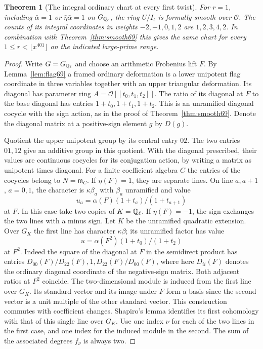 \documentclass[a4paper,11pt]{article}
\newtheorem{theorem}[proposition]{Theorem}
\theoremstyle{definition}
\theoremstyle{remark}
\numberwithin{equation}{section}
\newcommand{\OO}{\mathcal O}
\begin{document}
\begin{theorem}[The integral ordinary chart at every first twist]\label{thm:first72}
For \(r=1\), including \(\bar\alpha=1\) or
\(\bar\eta\bar\alpha=1\) on \(G_{\mathbb Q_\ell}\), the ring \(U/I_t\)
is formally smooth over \(\OO\). The counts of its integral
coordinates in weights \(-2,-1,0,1,2\) are \(1,2,3,4,2\).
In combination with Theorem~\ref{thm:smooth69} this gives the
same chart for every \(1\le r<\lfloor x^{401}\rfloor\) on the
indicated large-prime range.
\end{theorem}
\begin{proof}
Write \(G=G_{\mathbb Q_\ell}\) and choose an arithmetic Frobenius
lift \(F\). By Lemma~\ref{lem:flag69} a framed ordinary
deformation is a lower unipotent flag coordinate in three
variables together with an upper triangular deformation.
Its diagonal has parameter ring \(A=\OO[[t_0,t_1,t_2]]\).
The ratio of its diagonal at \(F\) to the base diagonal has
entries \(1+t_0,1+t_1,1+t_2\). This is an unramified
diagonal cocycle with the sign action, as in the proof of
Theorem~\ref{thm:smooth69}. Denote the diagonal matrix at a
positive-sign element \(g\) by \(D(g)\).

Quotient the upper unipotent group by its central entry \(02\).
The two entries \(01,12\) give an additive group in this
quotient. With the diagonal prescribed, their values are
continuous cocycles for its conjugation action, by writing
a matrix as unipotent times diagonal. For a finite coefficient
algebra \(C\) the entries of the cocycles belong to
\(N=\mathfrak m_C\). If \(\eta(F)=1\), they are separate
lines. On line \(a,a+1\), \(a=0,1\), the character is
\(\kappa\beta_a\) with \(\beta_a\) unramified and value
\[
          u_a=\alpha(F)(1+t_a)/(1+t_{a+1})
\]
at \(F\). In this case take two copies of \(K=\mathbb Q_\ell\).
If \(\eta(F)=-1\), the sign exchanges the two lines with
a minus sign. Let \(K\) be the unramified quadratic extension.
Over \(G_K\) the first line has character \(\kappa\beta\);
its unramified factor has value
\[
                       u=\alpha(F^2)(1+t_0)/(1+t_2)
\]
at \(F^2\). Indeed the square of the diagonal at \(F\)
in the semidirect product has entries
\(D_{00}(F)/D_{22}(F),1,D_{22}(F)/D_{00}(F)\), where here
\(D_{ii}(F)\) denotes the ordinary diagonal coordinate of the
negative-sign matrix. Both adjacent ratios at \(F^2\) coincide.
The two-dimensional module is induced from the first line
over \(G_K\). Its standard vector and its image under
\(F\) form a basis since the
second vector is a unit multiple of the other standard vector.
This construction commutes with coefficient changes. Shapiro's
lemma identifies its first cohomology with that of this single
line over \(G_K\). Use one index \(\nu\) for each of the two
lines in the first case, and one index for the induced module
in the second. The sum of the associated degrees \(f_\nu\)
is always two.


\end{proof}
\end{document}
